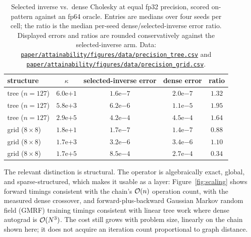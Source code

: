 \begin{table}[htbp]
  \centering
  \caption{Selected inverse vs.\ dense Cholesky at equal fp32 precision,
  scored on-pattern against an fp64 oracle. Entries are medians over four
  seeds per cell; the ratio is the median per-seed dense/selected-inverse
  error ratio. Displayed errors and ratios are rounded conservatively against
  the selected-inverse arm. Data:
  \href{https://github.com/vanshsehrawat14/gabp-sparse-inv/blob/main/paper/attainability/figures/data/precision_tree.csv}
{\nolinkurl{paper/attainability/figures/data/precision_tree.csv}} and
  \href{https://github.com/vanshsehrawat14/gabp-sparse-inv/blob/main/paper/attainability/figures/data/precision_grid.csv}
{\nolinkurl{paper/attainability/figures/data/precision_grid.csv}}.}
  \label{tab:precision}
  \begin{tabular}{lcccc}
    \toprule
    structure & $\kappa$ & selected-inverse error & dense error & ratio \\
    \midrule
    tree ($n{=}127$) & $6.0\mathrm{e}{+1}$ & $1.6\mathrm{e}{-7}$ & $2.0\mathrm{e}{-7}$ & $1.32$ \\
    tree ($n{=}127$) & $5.8\mathrm{e}{+3}$ & $6.2\mathrm{e}{-6}$ & $1.1\mathrm{e}{-5}$ & $1.95$ \\
    tree ($n{=}127$) & $2.9\mathrm{e}{+5}$ & $4.2\mathrm{e}{-4}$ & $4.5\mathrm{e}{-4}$ & $1.64$ \\
    grid ($8{\times}8$) & $1.8\mathrm{e}{+1}$ & $1.7\mathrm{e}{-7}$ & $1.4\mathrm{e}{-7}$ & $0.88$ \\
    grid ($8{\times}8$) & $1.7\mathrm{e}{+3}$ & $3.2\mathrm{e}{-6}$ & $3.4\mathrm{e}{-6}$ & $1.10$ \\
    grid ($8{\times}8$) & $1.7\mathrm{e}{+5}$ & $8.5\mathrm{e}{-4}$ & $2.7\mathrm{e}{-4}$ & $0.34$ \\
    \bottomrule
  \end{tabular}
\end{table}

The relevant distinction is structural. The operator is algebraically exact,
global, and sparse-structured, which makes it usable as a layer:
Figure~\ref{fig:scaling} shows forward timings consistent with the chain's
$\mathcal{O}(n)$ operation count, with the measured dense crossover, and
forward-plus-backward Gaussian Markov random field (GMRF) training timings
consistent with linear tree work
where dense autograd is $\mathcal{O}(N^3)$. The cost still grows with problem size,
linearly on the chain shown here; it does not acquire an iteration count
proportional to graph distance.

